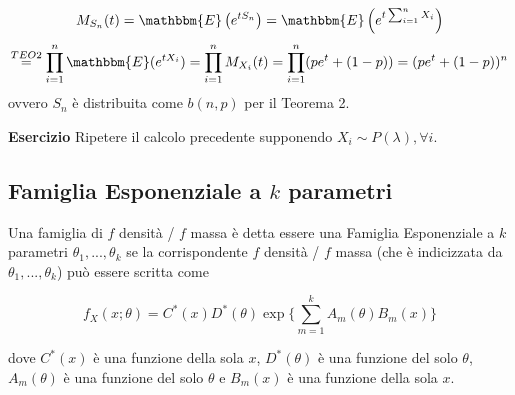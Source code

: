 $$M_{S_n}(t) = \mathbbm{E} \left( {e^{t S_n}} \right)  = \mathbbm{E} \left( {e^{t \sum_{i=1}^n X_i}} \right) $$
$$\stackrel{TEO 2}
{=} \displaystyle\prod_{i=1}^n \mathbbm{E}({e^{tX_i}}) = \displaystyle\prod_{i=1}^n M_{X_i}(t) = \displaystyle\prod_{i=1}^n (p e^t + (1-p)) = (p e^t + (1-p))^n$$ ovvero $S_n$ è distribuita come $b(n,p)$ per il Teorema 2.

\noindent \textbf{Esercizio}
Ripetere il calcolo precedente supponendo $X_i \sim P(\lambda), \forall i$.

\subsection{Famiglia Esponenziale a $k$ parametri}
Una famiglia di $f$ densità / $f$ massa è detta essere una Famiglia Esponenziale a $k$ parametri $\theta_1,...,\theta_k$ se la corrispondente $f$ densità / $f$ massa (che è indicizzata da $\theta_1,...,\theta_k$) può essere scritta come

$$f_X(x;\theta) = C^*(x) D^*(\theta) \exp \lbrace \displaystyle\sum_{m=1}^k A_m(\theta) B_m (x) \rbrace$$

dove $C^*(x)$ è una funzione della sola $x$, $D^*(\theta)$ è una funzione del solo $\theta$, $A_m(\theta)$ è una funzione del solo $\theta$ e $B_m(x)$ è una funzione della sola $x$.

